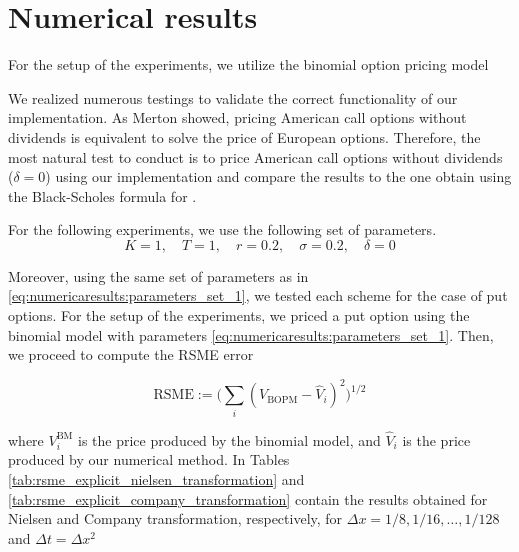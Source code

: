 \section{Numerical results}
For the setup of the experiments, we utilize the binomial option pricing model \cite{cox_1979}

We realized numerous testings to validate the correct functionality of our implementation. As Merton \cite{merton_1973} showed, pricing American call options without dividends is equivalent to solve the price of European options. Therefore, the most natural test to conduct is to price American call options without dividends ($\delta=0$) using our implementation and compare the results to the one obtain using the Black-Scholes formula for  \cite{merton_1973}. 

For the following experiments, we use the following set of parameters.
\begin{equation}
    \label{eq:numericaresults:parameters_set_1}
    K = 1, \quad T = 1, \quad r=0.2, \quad \sigma=0.2, \quad \delta = 0 
\end{equation}

Moreover, using the same set of parameters as in \eqref{eq:numericaresults:parameters_set_1}, we tested each scheme for the case of put options. For the setup of the experiments, we priced a put option using the binomial model \cite{cox_1979} with parameters \eqref{eq:numericaresults:parameters_set_1}. Then, we proceed to compute the RSME error 

\begin{equation}
    \label{eq:numericaresults:rsme}
    \text{RSME} := \bigg(\sum_{i}{(V_{\text{BOPM}} - \hat{V}_i)^2}\bigg)^{1/2}
\end{equation}

where $V^{\text{BM}}_i$ is the price produced by the binomial model, and $\hat{V}_i$ is the price produced by our numerical method. In Tables \ref{tab:rsme_explicit_nielsen_transformation} and \ref{tab:rsme_explicit_company_transformation} contain the results obtained for Nielsen and Company transformation, respectively, for $\Delta{x}=1/8, 1/16,\dots,1/128$ and $\Delta{t}=\Delta{x}^2$


